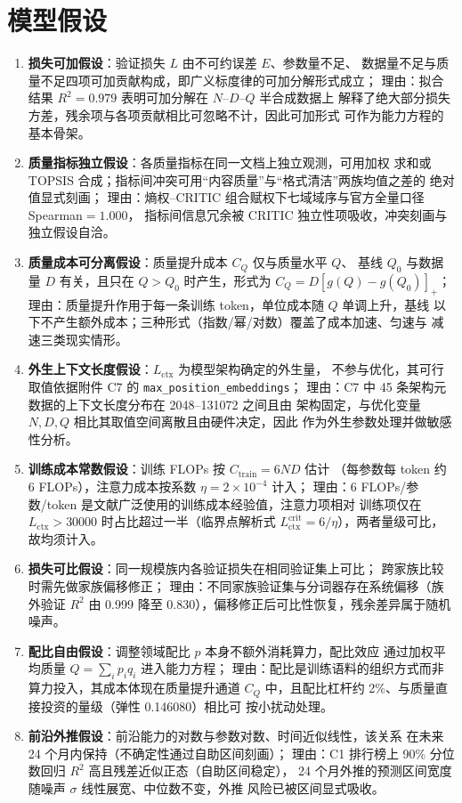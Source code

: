 \section{模型假设}

\begin{enumerate}
\item \textbf{损失可加假设}：验证损失 $L$ 由不可约误差 $E$、参数量不足、
数据量不足与质量不足四项可加贡献构成，即广义标度律的可加分解形式成立；
理由：拟合结果 $R^2=0.979$ 表明可加分解在 $N$--$D$--$Q$ 半合成数据上
解释了绝大部分损失方差，残余项与各项贡献相比可忽略不计，因此可加形式
可作为能力方程的基本骨架。
\item \textbf{质量指标独立假设}：各质量指标在同一文档上独立观测，可用加权
求和或 TOPSIS 合成；指标间冲突可用``内容质量''与``格式清洁''两族均值之差的
绝对值显式刻画；
理由：熵权--CRITIC 组合赋权下七域域序与官方全量口径 Spearman$=1.000$，
指标间信息冗余被 CRITIC 独立性项吸收，冲突刻画与独立假设自洽。
\item \textbf{质量成本可分离假设}：质量提升成本 $C_Q$ 仅与质量水平 $Q$、
基线 $Q_0$ 与数据量 $D$ 有关，且只在 $Q>Q_0$ 时产生，形式为
$C_Q=D[g(Q)-g(Q_0)]_+$；
理由：质量提升作用于每一条训练 token，单位成本随 $Q$ 单调上升，基线
以下不产生额外成本；三种形式（指数/幂/对数）覆盖了成本加速、匀速与
减速三类现实情形。
\item \textbf{外生上下文长度假设}：$L_{\text{ctx}}$ 为模型架构确定的外生量，
不参与优化，其可行取值依据附件 C7 的 \texttt{max\_position\_embeddings}；
理由：C7 中 45 条架构元数据的上下文长度分布在 2048--131072 之间且由
架构固定，与优化变量 $N,D,Q$ 相比其取值空间离散且由硬件决定，因此
作为外生参数处理并做敏感性分析。
\item \textbf{训练成本常数假设}：训练 FLOPs 按 $C_{\text{train}}=6ND$ 估计
（每参数每 token 约 6 FLOPs\cite{refRae}），注意力成本按系数 $\eta=2\times10^{-4}$ 计入；
理由：6 FLOPs/参数/token 是文献广泛使用的训练成本经验值，注意力项相对
训练项仅在 $L_{\text{ctx}}>30000$ 时占比超过一半（临界点解析式
$L_{\text{ctx}}^{\text{crit}}=6/\eta$），两者量级可比，故均须计入。
\item \textbf{损失可比假设}：同一规模族内各验证损失在相同验证集上可比；
跨家族比较时需先做家族偏移修正；
理由：不同家族验证集与分词器存在系统偏移（族外验证 $R^2$ 由 0.999 降至
0.830），偏移修正后可比性恢复，残余差异属于随机噪声。
\item \textbf{配比自由假设}：调整领域配比 $p$ 本身不额外消耗算力，配比效应
通过加权平均质量 $Q=\sum_i p_i q_i$ 进入能力方程；
理由：配比是训练语料的组织方式而非算力投入，其成本体现在质量提升通道
$C_Q$ 中，且配比杠杆约 2\%、与质量直接投资的量级（弹性 0.146080）相比可
按小扰动处理。
\item \textbf{前沿外推假设}：前沿能力的对数与参数对数、时间近似线性，该关系
在未来 24 个月内保持（不确定性通过自助区间刻画）；
理由：C1 排行榜上 90\% 分位数回归 $R^2$ 高且残差近似正态（自助区间稳定），
24 个月外推的预测区间宽度随噪声 $\sigma$ 线性展宽、中位数不变，外推
风险已被区间显式吸收。
\end{enumerate}
